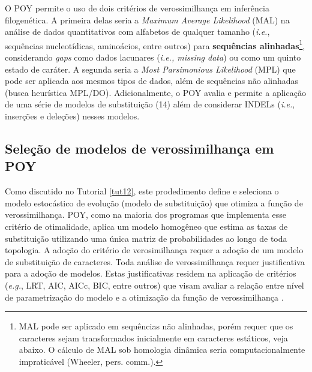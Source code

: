 \begin{refsection}
O POY permite o uso de dois critérios de verossimilhança em inferência filogenética. A primeira delas seria a \textit{Maximum Average Likelihood} (MAL) na análise de dados quantitativos com alfabetos de qualquer tamanho (\textit{i.e.}, sequências nucleotídicas, aminoácios, entre outros) para \textbf{sequências alinhadas}\footnote{MAL pode ser aplicado em sequências não alinhadas, porém requer que os caracteres sejam transformados inicialmente em caracteres estáticos, veja abaixo. O cálculo de MAL sob homologia dinâmica seria computacionalmente impraticável (Wheeler, pers. comm.).}, considerando \textit{gaps} como dados lacunares (\textit{i.e., missing data}) ou como um quinto estado de caráter. A segunda seria a \textit{Most Parsimonious Likelihood} (MPL) que pode ser aplicada aos mesmos tipos de dados, além de sequências não alinhadas (busca heurística MPL/DO). Adicionalmente, o POY avalia e permite a aplicação de uma série de modelos de substituição (14) além de considerar INDELs (\textit{i.e.}, inserções e deleções) nesses modelos.


\subsection{Seleção de modelos de verossimilhança em POY}\label{tut13:ml:modeltest}

Como discutido no Tutorial \ref{tut12}, este prodedimento define e seleciona o modelo estocástico de evolução (modelo de substituição) que otimiza a função de verossimilhança. POY, como na maioria dos programas que implementa esse critério de otimalidade, aplica um modelo homogêneo que estima as taxas de substituição utilizando uma única matriz de probabilidades ao longo de toda topologia. A adoção do critério de verosimilhança requer a adoção de um modelo de substituição de caracteres.
Toda análise de verossimilhança requer justificativa para a adoção de modelos. Estas justificativas residem na aplicação de critérios (\textit{e.g.}, LRT, AIC, AICc, BIC, entre outros) que visam avaliar a relação entre nível de parametrização do modelo e a otimização da função de verossimilhança \parencite[veja breve discussão e referências em][; Tutorial \ref{tut12}]{Darriba_and_Posada_2015}.


\end{refsection}
